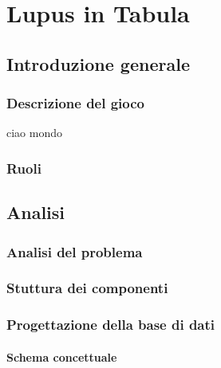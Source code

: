 \documentclass[10pt,twoside,cucitura]{toptesi}
\begin{document}
\frontespizio

\sommario


\indici

\mainmatter

\part{Lupus in Tabula}


\chapter{Introduzione generale}

\section{Descrizione del gioco}
ciao mondo


\section{Ruoli}


\chapter{Analisi}

\section{Analisi del problema}


\section{Stuttura dei componenti}


\section{Progettazione della base di dati}


\subsection{Schema concettuale}

\end{document}
